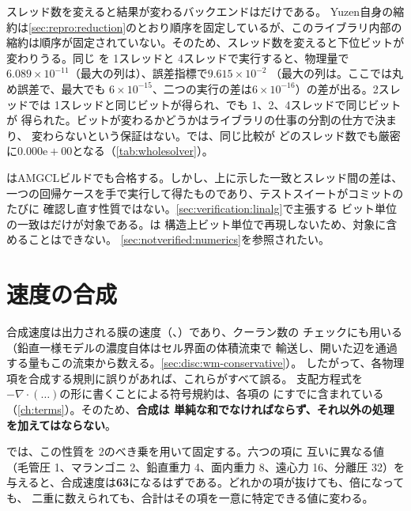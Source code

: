 スレッド数を変えると結果が変わるバックエンドはだけである。
Yuzen自身の縮約は\cref{sec:repro:reduction}のとおり順序を固定しているが、このライブラリ内部の
縮約は順序が固定されていない。そのため、スレッド数を変えると下位ビットが変わりうる。同じ
を 1スレッドと 4スレッドで実行すると、物理量で
$6.089\times10^{-11}$（最大の列は）、誤差指標で$9.615\times10^{-2}$
（最大の列は。ここでは丸め誤差で、最大でも
$6\times10^{-15}$、二つの実行の差は$6\times10^{-16}$）の差が出る。2スレッドでは
1スレッドと同じビットが得られ、でも 1、2、4スレッドで同じビットが
得られた。ビットが変わるかどうかはライブラリの仕事の分割の仕方で決まり、
変わらないという保証はない。では、同じ比較が
どのスレッド数でも厳密に$0.000\mathrm{e}{+}00$となる（\cref{tab:wholesolver}）。

\begin{warn}
  はAMGCLビルドでも合格する。しかし、上に示した一致とスレッド間の差は、
  一つの回帰ケースを手で実行して得たものであり、テストスイートがコミットのたびに
  確認し直す性質ではない。\cref{sec:verification:linalg}で主張する
  ビット単位の一致はだけが対象である。は
  構造上ビット単位で再現しないため、対象に含めることはできない。
  \cref{sec:notverified:numerics}を参照されたい。
\end{warn}

\section{速度の合成}
\label{sec:verification:velocity}

合成速度は出力される膜の速度（、）であり、クーラン数の
チェックにも用いる（鉛直一様モデルの濃度自体はセル界面の体積流束で
輸送し、開いた辺を通過する量もこの流束から数える。\cref{sec:disc:wm-conservative}）。
したがって、各物理項を合成する規則に誤りがあれば、これらがすべて誤る。
支配方程式を$-\nabla\cdot(\dots)$の形に書くことによる符号規約は、各項の
にすでに含まれている（\cref{ch:terms}）。そのため、\textbf{合成は
単純な和でなければならず、それ以外の処理を加えてはならない}。

では、この性質を 2のべき乗を用いて固定する。六つの項に
互いに異なる値（毛管圧 1、マランゴニ 2、鉛直重力 4、面内重力 8、遠心力 16、分離圧 32）を
与えると、合成速度は\textbf{63}になるはずである。どれかの項が抜けても、倍になっても、
二重に数えられても、合計はその項を一意に特定できる値に変わる。


